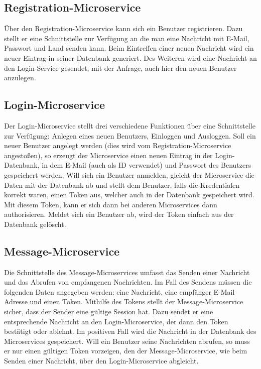 \subsection{Registration-Microservice}
Über den Registration-Microservice kann sich ein Benutzer registrieren. Dazu stellt er eine Schnittstelle zur Verfügung an die man eine Nachricht mit E-Mail, Passwort und Land senden kann. Beim Eintreffen einer neuen Nachricht wird ein neuer Eintrag in seiner Datenbank generiert. Des Weiteren wird eine Nachricht an den Login-Service gesendet, mit der Anfrage, auch hier den neuen Benutzer anzulegen.

\subsection{Login-Microservice}
Der Login-Microservice stellt drei verschiedene Funktionen über eine Schnittstelle zur Verfügung: Anlegen eines neuen Benutzers, Einloggen und Ausloggen. Soll ein neuer Benutzer angelegt werden (dies wird vom Registration-Microservice angestoßen), so erzeugt der Microservice einen neuen Eintrag in der Login-Datenbank, in dem E-Mail (auch als ID verwendet) und Passwort des Benutzers gespeichert werden. Will sich ein Benutzer anmelden, gleicht der Microservice die Daten mit der Datenbank ab und stellt dem Benutzer, falls die Kredentialen korrekt waren, einen Token aus, welcher auch in der Datenbank gespeichert wird. Mit diesem Token, kann er sich dann bei anderen Microservices dann authorisieren. Meldet sich ein Benutzer ab, wird der Token einfach aus der Datenbank gelöscht.

\subsection{Message-Microservice}
Die Schnittstelle des Message-Microservices umfasst das Senden einer Nachricht und das Abrufen von empfangenen Nachrichten. Im Fall des Sendens müssen die folgenden Daten angegeben werden: eine Nachricht, eine empfänger E-Mail Adresse und einen Token. Mithilfe des Tokens stellt der Message-Microservice sicher, dass der Sender eine gültige Session hat. Dazu sendet er eine entsprechende Nachricht an den Login-Microservice, der dann den Token bestätigt oder ablehnt. Im positiven Fall wird die Nachricht in der Datenbank des Microservices gespeichert. Will ein Benutzer seine Nachrichten abrufen, so muss er nur einen gültigen Token vorzeigen, den der Message-Microservice, wie beim Senden einer Nachricht, über den Login-Microservice abgleicht.

